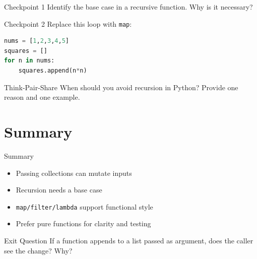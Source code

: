 \documentclass{beamer}
\begin{document}
\begin{frame}[fragile]{Checkpoint 1}
  Identify the base case in a recursive function. Why is it necessary?
\end{frame}

\begin{frame}[fragile]{Checkpoint 2}
  Replace this loop with \texttt{map}:
  \begin{lstlisting}[language=Python]
nums = [1,2,3,4,5]
squares = []
for n in nums:
    squares.append(n*n)
  \end{lstlisting}
\end{frame}

\begin{frame}[fragile]{Think-Pair-Share}
  When should you avoid recursion in Python?
  Provide one reason and one example.
\end{frame}

\section{Summary}
\label{sec:summary}

\begin{frame}[fragile]{Summary}
  \begin{itemize}[<+->]
    \item Passing collections can mutate inputs
    \item Recursion needs a base case
    \item \texttt{map/filter/lambda} support functional style
    \item Prefer pure functions for clarity and testing
  \end{itemize}
\end{frame}

\begin{frame}[fragile]{Exit Question}
  If a function appends to a list passed as argument, does the caller see the change? Why?
\end{frame}
\end{document}
